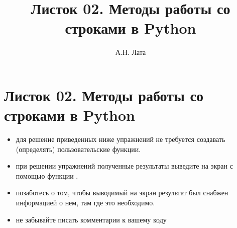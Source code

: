 \documentclass[a4,12pt]{article}
\title{Листок 02. Методы работы со строками в Python}
\author{А.Н. Лата}
\theoremstyle{remark}
\begin{document}
 


\section*{\centering Листок 02. Методы работы со строками в Python}

\begin{exercisenote}[title=Замечания]
\begin{itemize}
    \item для решение приведенных ниже упражнений не требуется создавать (определять) пользовательские функции.
    \item при решении упражнений полученные результаты выведите на экран с помощью функции {\color{blue}{print()}}.
    \item позаботесь о том, чтобы выводимый на экран результат был снабжен информацией о нем, там где это необходимо.
    \item не забывайте писать комментарии к вашему коду
\end{itemize}
\end{exercisenote}

\end{document}
